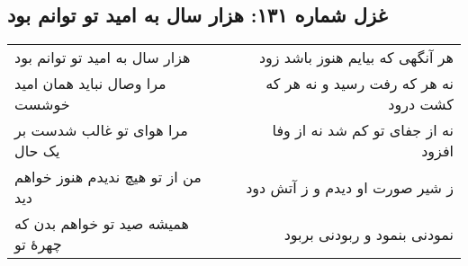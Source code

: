 \begin{center}
\section*{غزل شماره ۱۳۱: هزار سال به امید تو توانم بود}
\label{sec:131}
\begin{longtable}{l p{0.5cm} r}
هزار سال به امید تو توانم بود
&&
هر آنگهی که بیایم هنوز باشد زود
\\
مرا وصال نباید همان امید خوشست
&&
نه هر که رفت رسید و نه هر که کشت درود
\\
مرا هوای تو غالب شدست بر یک حال
&&
نه از جفای تو کم شد نه از وفا افزود
\\
من از تو هیچ ندیدم هنوز خواهم دید
&&
ز شیر صورت او دیدم و ز آتش دود
\\
همیشه صید تو خواهم بدن که چهرهٔ تو
&&
نمودنی بنمود و ربودنی بربود
\\
\end{longtable}
\end{center}
